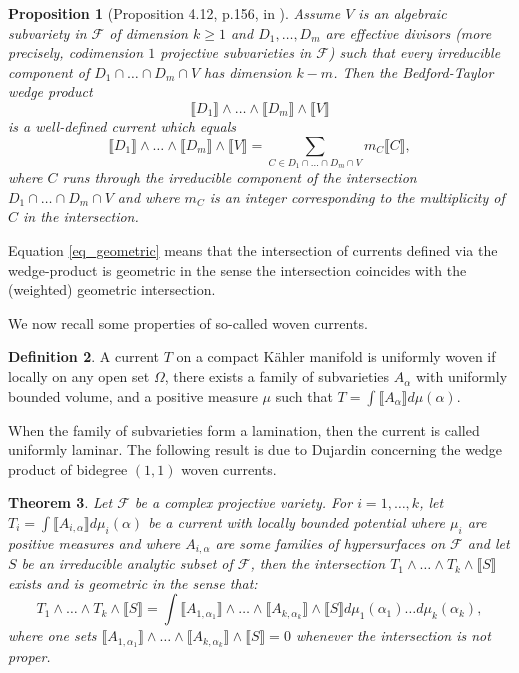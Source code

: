 \documentclass[12pt]{amsbook}%
\newtheorem{thm}{Theorem}[chapter]
\newtheorem{prop}[thm]{Proposition}
\theoremstyle{definition}
\newtheorem{defi}[thm]{Definition}
\theoremstyle{remark}
\numberwithin{section}{chapter}
\numberwithin{subsection}{section}
\numberwithin{figure}{chapter}
\newcommand\intcur[1]{\llbracket #1 \rrbracket}
\def\cF{{\mathscr{F}}}
\begin{document}
{{\begin{prop} [Proposition 4.12, p.156, in \cite{demailly}]  
\label{prop_demailly_algebraic}
Assume $V$ is an algebraic subvariety in $\cF$ of dimension $k \geqslant 1$ and $D_1, \ldots, D_m$ are effective divisors (more precisely, codimension $1$ projective subvarieties in $\cF$) such that every irreducible component of 
$D_1 \cap \ldots \cap D_m \cap V$ has dimension $k-m$. Then the Bedford-Taylor wedge product 
$$\llbracket D_1\rrbracket \wedge \ldots \wedge \llbracket D_m\rrbracket \wedge \llbracket V\rrbracket $$ 
is a well-defined 
current 
which equals
\begin{equation} \label{eq_geometric}
\llbracket D_1 \rrbracket \wedge  \ldots \wedge \llbracket D_m \rrbracket \wedge \intcur{V} = \sum_{C \in D_1 \cap \ldots \cap D_m \cap V } m_C \intcur{C},    
\end{equation} 
where $C$ runs through the irreducible component of the intersection $D_1 \cap \ldots \cap D_m \cap V$ and where $m_C$ is an integer corresponding to the multiplicity of $C$ in the intersection. 
\end{prop} 

Equation \eqref{eq_geometric} means that the intersection  of currents defined via the wedge-product  is geometric in the sense the intersection coincides with the  (weighted) geometric intersection. 

  We now recall some properties of so-called woven currents. 
  
  \begin{defi} \label{defi_woven} A current $T$ on a compact K\"ahler manifold is uniformly woven if locally on any open set $\Omega$, there exists a family of subvarieties $A_\alpha$ with uniformly bounded volume, and a positive measure $\mu$ such that $T = \int \intcur{A_\alpha} d\mu(\alpha)$.   
  \end{defi}
When the family of subvarieties form a lamination, then the current is called uniformly laminar.   
  The following result is due to Dujardin concerning the wedge product of bidegree $(1,1)$ woven currents.
  
  \begin{thm} \cite[Theorem 3.1]{dujardin_support_bifurcation} Let $\cF$  be a complex projective variety. For $i=1, \ldots, k$, let $T_i = \int \intcur{A_{i,\alpha}} d\mu_i(\alpha) $ be a current with locally bounded potential where $\mu_i$ are positive measures and where $A_{i,\alpha}$ are some families of hypersurfaces on $\cF$ and let $S$ be an irreducible analytic subset of $\cF$, then the intersection 
  $T_1 \wedge \ldots \wedge T_k \wedge \intcur{S}$ exists and is geometric in the sense that: 
  \begin{equation}
  T_1 \wedge \ldots \wedge T_k \wedge \intcur{S} = \int  \intcur{A_{1, \alpha_1}} \wedge \ldots \wedge \intcur{A_{k,\alpha_k}} \wedge \intcur{S}  d\mu_1(\alpha_1) \ldots d\mu_k(\alpha_k),
\end{equation}     
where one sets $\intcur{A_{1, \alpha_1}} \wedge \ldots \wedge \intcur{A_{k,\alpha_k}} \wedge \intcur{S} =0$ whenever the intersection is not proper. 
  \end{thm} 
  
}}
\end{document}
